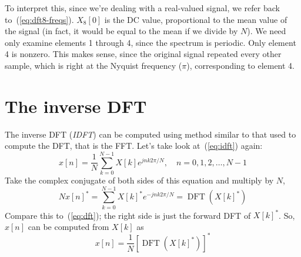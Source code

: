 To interpret this, since we're dealing with a real-valued signal, we
refer back to~(\ref{eq:dft8-freqs}). $X_8[0]$ is the DC value,
proportional to the mean value of the signal (in fact, it would be
equal to the mean if we divide by $N$). We need only examine elements
1 through 4, since the spectrum is periodic. Only element 4 is
nonzero. This makes sense, since the original signal repeated every
other sample, which is right at the Nyquist frequency ($\pi$),
corresponding to element 4.


\section{The inverse DFT}

The inverse DFT (\emph{IDFT}) can be computed using method similar to
that used to compute the DFT, that is the FFT. Let's take look
at~(\ref{eq:idft}) again:
\begin{equation*}
x[n]=\frac{1}{N} \sum_{k=0}^{N-1} X[k] e^{j n k 2\pi/N}, \quad
n=0,1,2,\ldots, N-1
\end{equation*}
Take the complex conjugate of both sides of this equation and multiply
by $N$, 
\begin{equation}
Nx[n]^*=\sum_{k=0}^{N-1} X[k]^* e^{-j n k 2\pi/N} = \operatorname{DFT}(X[k]^*)
\end{equation}
Compare this to~(\ref{eq:dft}); the right side is just the forward
DFT of $X[k]^*$. So, $x[n]$ can be computed from $X[k]$ as 
\begin{equation}
x[n]=\frac{1}{N} [\operatorname{DFT}(X[k]^*)]^*
\end{equation}

